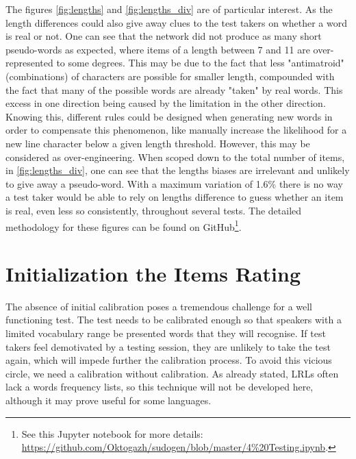 The figures \ref{fig:lengths} and \ref{fig:lengths_div} are of particular interest. As the length differences could also give away clues to the test takers on whether a word is real or not. One can see that the network did not produce as many short pseudo-words as expected, where items of a length between 7 and 11 are over-represented to some degrees. This may be due to the fact that less "antimatroid" (combinations) of characters are possible for smaller length, compounded with the fact that many of the possible words are already "taken" by real words. This excess in one direction being caused by the limitation in the other direction. Knowing this, different rules could be designed when generating new words in order to compensate this phenomenon, like manually increase the likelihood for a new line character below a given length threshold. However, this may be considered as over-engineering. When scoped down to the total number of items, in \ref{fig:lengths_div}, one can see that the lengths biases are irrelevant and unlikely to give away a pseudo-word. With a maximum variation of 1.6\% there is no way a test taker would be able to rely on lengths difference to guess whether an item is real, even less so consistently, throughout several tests. The detailed methodology for these figures can be found on GitHub\footnote{See this Jupyter notebook for more details: \url{https://github.com/Oktogazh/sudogen/blob/master/4\%20Testing.ipynb}.}.


\section{Initialization the Items Rating}
The absence of initial calibration poses a tremendous challenge for a well functioning test. The test needs to be calibrated enough so that speakers with a limited vocabulary range be presented words that they will recognise. If test takers feel demotivated by a testing session, they are unlikely to take the test again, which will impede further the calibration process. To avoid this vicious circle, we need a calibration without calibration. As already stated, LRLs often lack a words frequency lists, so this technique will not be developed here, although it may prove useful for some languages.

